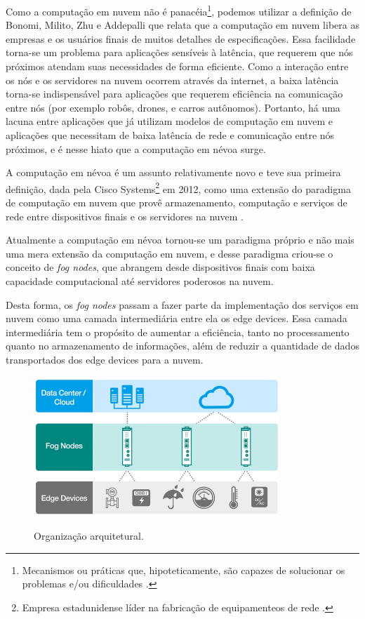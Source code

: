 Como a computação em nuvem não é panacéia\footnote{Mecanismos ou práticas que, hipoteticamente, são capazes de solucionar os problemas e/ou dificuldades \cite{definition:panaceia}.}, podemos utilizar a definição de Bonomi, Milito, Zhu e Addepalli \cite{Bonomi:2012} que relata que a computação em nuvem libera as empresas e os usuários finais de muitos detalhes de especificações.
Essa facilidade torna-se um problema para aplicações sensíveis à latência, que requerem que nós próximos atendam suas necessidades de forma eficiente. 
Como a interação entre os nós e os servidores na nuvem ocorrem através da internet, a baixa latência torna-se indispensável para aplicações que requerem eficiência na comunicação entre nós (por exemplo robôs, drones, e carros autônomos).
Portanto, há uma lacuna entre aplicações que já utilizam modelos de computação em nuvem e aplicações que necessitam de baixa latência de rede e comunicação entre nós próximos, e é nesse hiato que a computação em névoa surge.

A computação em névoa é um assunto relativamente novo e teve sua primeira definição, dada pela Cisco Systems\footnote{Empresa estadunidense líder na fabricação de equipamenteos de rede \cite{ciscoSystems}.} em 2012, como uma extensão do paradigma de computação em nuvem que provê armazenamento, computação e serviços de rede entre dispositivos finais e os servidores na nuvem \cite{DBLP:journals/corr/RomanLM16}. 

Atualmente a computação em névoa tornou-se um paradigma próprio e não mais uma mera extensão da computação em nuvem, e desse
paradigma criou-se o conceito de \textit{fog nodes}, que abrangem desde dispositivos finais com baixa capacidade computacional até servidores poderosos na nuvem.

Desta forma, os \textit{fog nodes} passam a fazer parte da implementação dos serviços em nuvem como uma camada intermediária entre ela os edge devices.
Essa camada intermediária tem o propósito de aumentar a eficiência, tanto no processamento quanto no armazenamento de informações, além de reduzir a quantidade de dados transportados dos edge devices para a nuvem\cite{fogdefinition:2016}.


\begin{figure}[htb!]
    \centering\includegraphics[width=.5\textwidth]{fig1.pdf}
    \caption [Organização arquitetural]
    {\label{fig:fig1} Organização arquitetural.} \cite{archfog:2017}
\end{figure}

